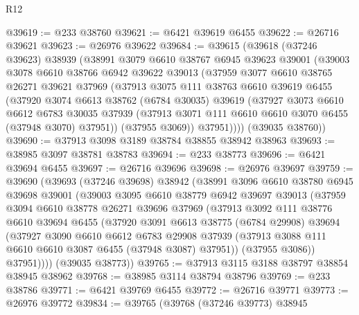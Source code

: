 \begin{lexlean}{R12}
\begin{coremodule}
@39619 := @233 @38760
@39621 := @6421 @39619 @6455
@39622 := @26716 @39621
@39623 := @26976 @39622
@39684 := @39615
    (@39618
      (@37246 @39623)
      @38939
      (@38991
        @3079
        @6610
        @38767
        @6945
        @39623
        @39001
        (@39003
          @3078
          @6610
          @38766
          @6942
          @39622
          @39013
          (@37959
            @3077
            @6610
            @38765
            @26271
            @39621
            @37969
            (@37913
              @3075
              @111
              @38763
              @6610
              @39619
              @6455
              (@37920
                @3074
                @6613
                @38762
                (@6784 @30035)
                @39619
                (@37927
                  @3073
                  @6610
                  @6612
                  @6783
                  @30035
                  @37939
                  (@37913 @3071 @111 @6610 @6610 @3070 @6455 (@37948 @3070) @37951))
                (@37955 @3069))
              @37951))))
      (@39035 @38760))
@39690 := @37913 @3098 @3189 @38784 @38855 @38942 @38963
@39693 := @38985 @3097 @38781 @38783
@39694 := @233 @38773
@39696 := @6421 @39694 @6455
@39697 := @26716 @39696
@39698 := @26976 @39697
@39759 := @39690
    (@39693
      (@37246 @39698)
      @38942
      (@38991
        @3096
        @6610
        @38780
        @6945
        @39698
        @39001
        (@39003
          @3095
          @6610
          @38779
          @6942
          @39697
          @39013
          (@37959
            @3094
            @6610
            @38778
            @26271
            @39696
            @37969
            (@37913
              @3092
              @111
              @38776
              @6610
              @39694
              @6455
              (@37920
                @3091
                @6613
                @38775
                (@6784 @29908)
                @39694
                (@37927
                  @3090
                  @6610
                  @6612
                  @6783
                  @29908
                  @37939
                  (@37913 @3088 @111 @6610 @6610 @3087 @6455 (@37948 @3087) @37951))
                (@37955 @3086))
              @37951))))
      (@39035 @38773))
@39765 := @37913 @3115 @3188 @38797 @38854 @38945 @38962
@39768 := @38985 @3114 @38794 @38796
@39769 := @233 @38786
@39771 := @6421 @39769 @6455
@39772 := @26716 @39771
@39773 := @26976 @39772
@39834 := @39765
    (@39768
      (@37246 @39773)
      @38945

\end{coremodule}
\end{lexlean}
